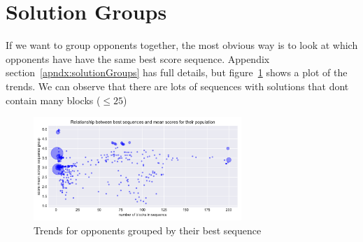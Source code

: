 \section{Solution Groups}\label{sec:solutionGroups}
If we want to group opponents together, the most obvious way is to look at which opponents have have the same best score sequence.
Appendix section~\ref{apndx:solutionGroups} has full details, but figure~\ref{fig:sequence_scatter} shows a plot of the trends. 
We can observe that there are lots of sequences with solutions that dont contain many blocks ($\le 25$)
\begin{figure}[ht]
    \includegraphics[width=0.7\textwidth, center]{./img/descriptive/sequence_scatter.pdf}
    \caption{Trends for opponents grouped by their best sequence}\label{fig:sequence_scatter}
\end{figure}

